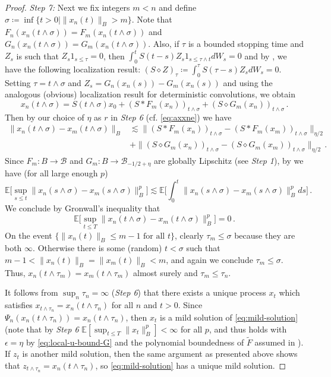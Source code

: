 \documentclass[final]{amsart}
\numberwithin{thm}{section}
\numberwithin{equation}{section}
\newcommand{\E}{\mathbb{E}}
\newcommand{\B}{\mathcal{B}}
\begin{document}
\begin{proof}
    \textit{Step 7:}
    Next we fix integers $m < n$ and define $\sigma \coloneqq \inf\{t > 0 \mid \|x_n(t)\|_B > m\}$. Note that $F_n(x_n(t \wedge \sigma)) = F_m(x_n(t \wedge \sigma))$ and $G_n(x_n(t \wedge \sigma)) = G_m(x_n(t \wedge \sigma))$. 
    Also, if $\tau$ is a bounded stopping time and $Z_s$ is such that $Z_s 1_{s \leq \tau} = 0$, then $\int_0^t S(t-s)Z_s 1_{s\leq \tau \wedge t}dW_s = 0$ and by \cite[Proposition 5.3]{umd-integration}, we have the following localization result: 
    $(S \diamond Z)_\tau \coloneqq \int_0^\tau S(\tau-s)Z_s dW_s = 0$. 
    Setting $\tau = t \wedge \sigma$ and $Z_s = G_n(x_n(s)) - G_m(x_n(s))$ and using the analogous (obvious) localization result for deterministic convolutions, we obtain
    $$
    x_n(t \wedge \sigma) = S(t\wedge \sigma)x_0 + (S * F_m(x_n))_{t \wedge \sigma} + (S \diamond G_m(x_n))_{t \wedge \sigma} \,.
    $$
    Then by our choice of $\eta$ as $r$ in \textit{Step 6} (cf. \eqref{eq:axxne}) we have
    \begin{align*}
        \|x_n(t \wedge \sigma) - x_m(t \wedge \sigma)\|_B &\lesssim \|(S * F_m(x_n))_{t \wedge \sigma} - (S * F_m(x_m))_{t \wedge \sigma}\|_{\eta/2} \\
        &+ \|(S \diamond G_m(x_n))_{t \wedge \sigma} - (S \diamond G_m(x_m))_{t \wedge \sigma}\|_{\eta/2} \,.
    \end{align*}
    Since $F_m:B \to \B$ and $G_m:B \to \B_{-1/2+\eta}$ are globally Lipschitz (see \textit{Step 1}), by  we have (for all large enough $p$)
    $$\E\Big[\sup_{s \leq t} \|x_n(s \wedge \sigma) - x_m(s \wedge \sigma)\|_B^p\Big] \lesssim \E\Big[\int_0^t \|x_n(s \wedge \sigma) - x_m(s \wedge \sigma)\|_B^pds\Big] \,.$$
    We conclude by Gronwall's inequality that
    $$\E\Big[\sup_{t \leq T} \|x_n(t \wedge \sigma) - x_m(t \wedge \sigma)\|_B^p\Big] = 0 \,.$$
    On the event $\{\|x_n(t)\|_B \leq m-1 \text{ for all } t\}$, clearly $\tau_m \leq \sigma$ because they are both $\infty$. Otherwise there is some (random) $t < \sigma$ such that $m-1 < \|x_n(t)\|_B = \|x_m(t)\|_B < m$, and again we conclude $\tau_m \leq \sigma$. Thus, $x_n(t \wedge \tau_m) = x_m(t \wedge \tau_m)$ almost surely and $\tau_m \leq \tau_n$.

    It follows from $\sup_n \tau_n = \infty$ (\textit{Step 6}) that there exists a unique process $x_t$ which satisfies $x_{t \wedge \tau_n} = x_n(t \wedge \tau_n)$ for all $n$ and $t > 0$. Since $\Psi_n(x_n(t \wedge \tau_n)) = x_n(t \wedge \tau_n)$, then $x_t$ is a mild solution of \eqref{eq:mild-solution} (note that by \textit{Step 6} $\E[\sup_{t \leq T} \|x_t\|_B^p] < \infty$ for all $p$, and thus  holds with $\epsilon = \eta$ by \eqref{eq:local-u-bound-G} and the polynomial boundedness of $\tilde F$ assumed in ). If $z_t$ is another mild solution, then the same argument as presented above shows that $z_{t \wedge \tau_n} = x_n(t \wedge \tau_n)$, so \eqref{eq:mild-solution} has a unique mild solution.
    

\end{proof}
\end{document}
